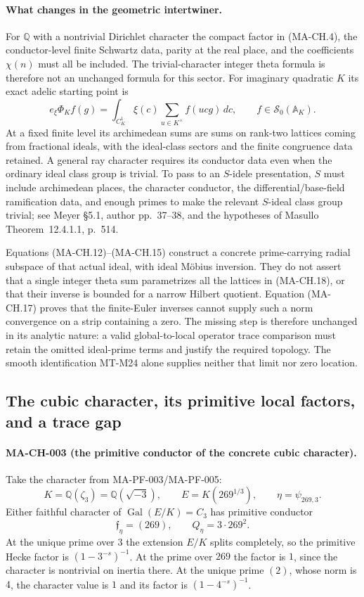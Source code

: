 \paragraph{What changes in the geometric intertwiner.}
For $\mathbb Q$ with a nontrivial Dirichlet character the
compact factor in (MA-CH.4), the conductor-level finite
Schwartz data, parity at the real place, and the coefficients
$\chi(n)$ must all be included.  The trivial-character
integer theta formula is therefore not an unchanged formula
for this sector.  For imaginary quadratic $K$ its exact
adelic starting point is
\[
  e_\xi\Phi_K f(g)
      =\int_{C_K^1}\xi(c)
              \sum_{u\in K^\times} f(ucg)\,dc,
 \qquad f\in\mathcal S_0(\mathbb A_K).
 \tag{MA-CH.18}
\]
At a fixed finite level its archimedean sums are sums on
rank-two lattices coming from fractional ideals, with the
ideal-class sectors and the finite congruence data retained.
A general ray character requires its conductor data even
when the ordinary ideal class group is trivial.  To pass
to an $S$-idele presentation, $S$ must include archimedean
places, the character conductor, the differential/base-field
ramification data, and enough primes to make the relevant
$S$-ideal class group trivial; see Meyer \S5.1,
author pp.~37--38, and the hypotheses of Masullo
Theorem~12.4.1.1, p.~514.

Equations (MA-CH.12)--(MA-CH.15) construct a concrete
prime-carrying radial subspace of that actual ideal, with
ideal M\"obius inversion.  They do not assert that a single
integer theta sum parametrizes all the lattices in
(MA-CH.18), or that their inverse is bounded for a narrow
Hilbert quotient.  Equation (MA-CH.17) proves that the
finite-Euler inverses cannot supply such a norm convergence
on a strip containing a zero.  The missing step is therefore
unchanged in its analytic nature: a valid global-to-local
operator trace comparison must retain the omitted ideal-prime
terms and justify the required topology.  The smooth
identification MT-M24 alone supplies neither that limit nor
zero location.

\subsection{The cubic character, its primitive local factors, and a trace gap}

\paragraph{MA-CH-003 (the primitive conductor of the concrete cubic character).}
Take the character from MA-PF-003/MA-PF-005:
\[
 K=\mathbb Q(\zeta_3)=\mathbb Q(\sqrt{-3}),\qquad
 E=K(269^{1/3}),\qquad \eta=\psi_{269,3}.
 \tag{MA-CH.19}
\]
Either faithful character of $\operatorname{Gal}(E/K)=C_3$
has primitive conductor
\[
     \mathfrak f_\eta=(269),\qquad
     Q_\eta=3\cdot269^2.
 \tag{MA-CH.20}
\]
At the unique prime over $3$ the extension $E/K$ splits
completely, so the primitive Hecke factor is
$(1-3^{-s})^{-1}$.  At the prime over $269$ the factor is
$1$, since the character is nontrivial on inertia there.
At the unique prime $(2)$, whose norm is $4$, the character
value is $1$ and its factor is $(1-4^{-s})^{-1}$.

